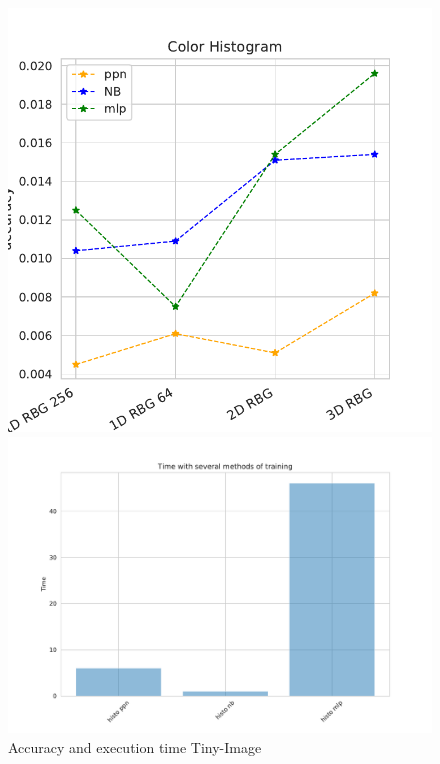 \documentclass[11pt]{article}
\begin{document}
\begin{figure}[H]
\begin{minipage}[c]{0.5\textwidth}
\includegraphics[width=1\linewidth]{figures/Tiny_Image/Accuracy_color_hist.pdf}
\end{minipage}
\begin{minipage}[c]{0.3\textwidth}
\includegraphics[width=1\linewidth]{figures/Tiny_Image/time_training.pdf}
\end{minipage}
\caption{Accuracy and execution time Tiny-Image}
\label{Accuracy_Tiny_Image}
\end{figure}
\end{document}
